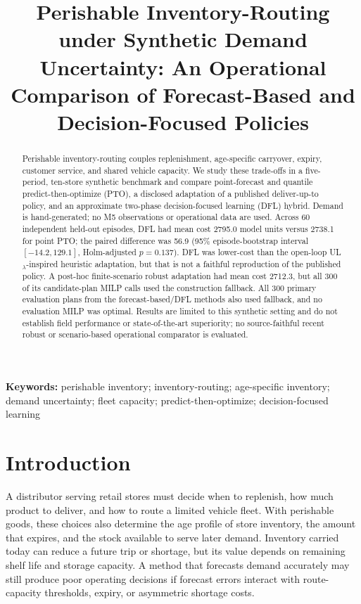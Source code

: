 \documentclass[11pt,a4paper]{article}
\title{Perishable Inventory-Routing under Synthetic Demand Uncertainty: An Operational Comparison of Forecast-Based and Decision-Focused Policies}
\author{}
\date{}
\begin{document}
\maketitle

\begin{abstract}
Perishable inventory-routing couples replenishment, age-specific carryover, expiry, customer service, and shared vehicle capacity. We study these trade-offs in a five-period, ten-store synthetic benchmark and compare point-forecast and quantile predict-then-optimize (PTO), a disclosed adaptation of a published deliver-up-to policy, and an approximate two-phase decision-focused learning (DFL) hybrid. Demand is hand-generated; no M5 observations or operational data are used. Across 60 independent held-out episodes, DFL had mean cost 2795.0 model units versus 2738.1 for point PTO; the paired difference was 56.9 (95\% episode-bootstrap interval $[-14.2,129.1]$, Holm-adjusted $p=0.137$). DFL was lower-cost than the open-loop UL$_\lambda$-inspired heuristic adaptation, but that is not a faithful reproduction of the published policy. A post-hoc finite-scenario robust adaptation had mean cost 2712.3, but all 300 of its candidate-plan MILP calls used the construction fallback. All 300 primary evaluation plans from the forecast-based/DFL methods also used fallback, and no evaluation MILP was optimal. Results are limited to this synthetic setting and do not establish field performance or state-of-the-art superiority; no source-faithful recent robust or scenario-based operational comparator is evaluated.
\end{abstract}

\noindent\textbf{Keywords:} perishable inventory; inventory-routing; age-specific inventory; demand uncertainty; fleet capacity; predict-then-optimize; decision-focused learning

\section{Introduction}

A distributor serving retail stores must decide when to replenish, how much product to deliver, and how to route a limited vehicle fleet. With perishable goods, these choices also determine the age profile of store inventory, the amount that expires, and the stock available to serve later demand. Inventory carried today can reduce a future trip or shortage, but its value depends on remaining shelf life and storage capacity. A method that forecasts demand accurately may still produce poor operating decisions if forecast errors interact with route-capacity thresholds, expiry, or asymmetric shortage costs.
\end{document}
